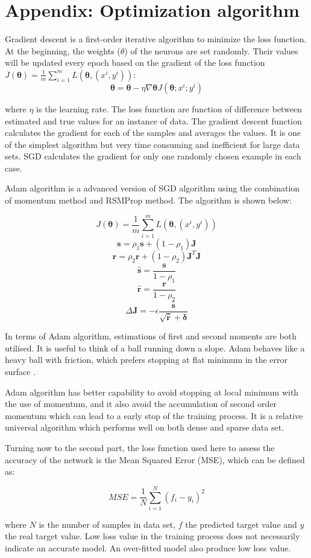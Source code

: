 \section{Appendix: Optimization algorithm}

Gradient descent is a first-order iterative algorithm to minimize the loss function. At the beginning, the weights ($\theta$) of the neurons are set randomly. Their values will be updated every epoch based on the gradient of the loss function $J(\boldsymbol\theta)=\frac{1}{m}\sum_{i=1}^{m}{L(\boldsymbol\theta,({x}^{i},{y}^{i}))}$:
$$\boldsymbol\theta = \boldsymbol\theta - \eta \nabla \boldsymbol\theta J(\boldsymbol\theta;{x}^{i};{y}^{i})$$

where $\eta$ is the learning rate. The loss function are function of difference between estimated and true values for an instance of data. The gradient descent function calculates the gradient for each of the samples and averages the values\cite{bottou2012stochastic}. It is one of the simplest algorithm but very time consuming and inefficient for large data sets. SGD calculates the gradient for only one randomly chosen example in each case.

Adam algorithm is a advanced version of SGD algorithm using the combination of momentum method and RSMProp method. The algorithm is shown below:

$$J(\boldsymbol\theta)=\frac{1}{m}\sum_{i=1}^{m}{L(\boldsymbol\theta,({x}^{i},{y}^{i}))}$$
$$\boldsymbol s = \rho_1 \boldsymbol s + (1 - \rho_1) \boldsymbol J$$
$$\boldsymbol r = \rho_2 \boldsymbol r + (1 - \rho_2) \boldsymbol J^T \boldsymbol J$$
$$\hat{\boldsymbol s} = \frac{\boldsymbol s}{1 - \rho_1}$$
$$\hat{\boldsymbol r} = \frac{\boldsymbol r}{1 - \rho_2}$$
$$\Delta \boldsymbol J = -\epsilon \frac{\hat{\boldsymbol s}}{\sqrt{\hat{\boldsymbol r}}+\boldsymbol \delta}$$

In terms of Adam algorithm\cite{kanwar2019deep}, estimations of first and second moments are both utilised. It is useful to think of a ball running down a slope. Adam behaves like a heavy ball with friction, which prefers stopping at flat minimum in the error surface \cite{kingma2014adam}.

Adam algorithm has better capability to avoid stopping at local minimum with the use of momentum, and it also avoid the accumulation of second order momentum which can lead to a early stop of the training process. It is a relative universal algorithm which performs well on both dense and sparse data set. 

Turning now to the second part, the loss function used here to assess the accuracy of the network is the Mean Squared Error (MSE), which can be defined as:

$$MSE = \frac{1}{N} \sum_{i=1}^{N}{(f_i - y_i)^2}$$

where $N$ is the number of samples in data set, $f$ the predicted target value and $y$ the real target value. Low loss value in the training process does not necessarily indicate an accurate model. An over-fitted model also produce low loss value. 